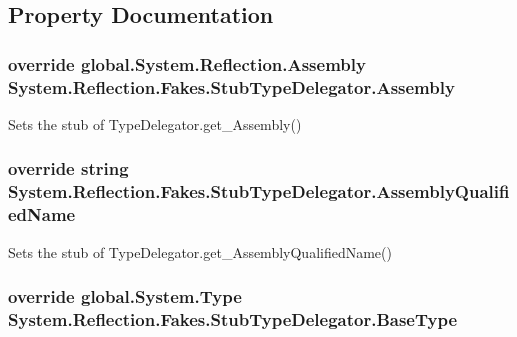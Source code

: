 \subsection{Property Documentation}
\hypertarget{class_system_1_1_reflection_1_1_fakes_1_1_stub_type_delegator_a82d167c19aa2403a3f0c1e7936829a11}{
\subsubsection[{Assembly}]{\setlength{\rightskip}{0pt plus 5cm}override global.\-System.\-Reflection.\-Assembly System.\-Reflection.\-Fakes.\-Stub\-Type\-Delegator.\-Assembly\hspace{0.3cm}{\ttfamily [get]}}}\label{class_system_1_1_reflection_1_1_fakes_1_1_stub_type_delegator_a82d167c19aa2403a3f0c1e7936829a11}


Sets the stub of Type\-Delegator.\-get\-\_\-\-Assembly()

\hypertarget{class_system_1_1_reflection_1_1_fakes_1_1_stub_type_delegator_ab9c2e3540ebbe2727df945860ddda8e4}{
\subsubsection[{Assembly\-Qualified\-Name}]{\setlength{\rightskip}{0pt plus 5cm}override string System.\-Reflection.\-Fakes.\-Stub\-Type\-Delegator.\-Assembly\-Qualified\-Name\hspace{0.3cm}{\ttfamily [get]}}}\label{class_system_1_1_reflection_1_1_fakes_1_1_stub_type_delegator_ab9c2e3540ebbe2727df945860ddda8e4}


Sets the stub of Type\-Delegator.\-get\-\_\-\-Assembly\-Qualified\-Name()

\hypertarget{class_system_1_1_reflection_1_1_fakes_1_1_stub_type_delegator_aebc3fbefbbce7416dcf21aad68a4eb0a}{
\subsubsection[{Base\-Type}]{\setlength{\rightskip}{0pt plus 5cm}override global.\-System.\-Type System.\-Reflection.\-Fakes.\-Stub\-Type\-Delegator.\-Base\-Type\hspace{0.3cm}{\ttfamily [get]}}}\label{class_system_1_1_reflection_1_1_fakes_1_1_stub_type_delegator_aebc3fbefbbce7416dcf21aad68a4eb0a}


